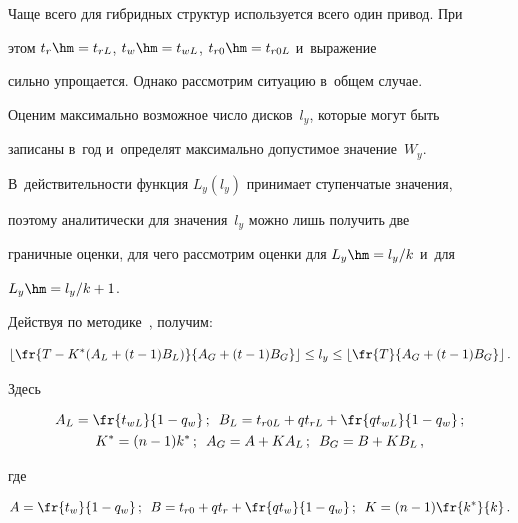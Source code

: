   Чаще всего для гибридных структур используется всего один привод. При 


этом $t_r\hm= t_{rL}$, $t_w\hm= t_{wL}$, $t_{r0}\hm= t_{r0L}$ и~выражение 


сильно упрощается. Однако рассмотрим ситуацию в~общем случае.


  


  Оценим максимально возможное число дисков~$l_y$, которые могут быть 


записаны в~год и~определят максимально допустимое значение~$W_y$. 


В~действительности функция $L_y(l_y)$ принимает ступенчатые значения, 


поэтому аналитически для значения~$l_y$ можно лишь получить две 


граничные оценки, для чего рассмотрим оценки для $L_y\hm= l_y/k$ и~для 


$L_y\hm= l_y/k+1$.


  


  Действуя по методике~\cite{7-che}, получим:


  $$


  \left\lfloor \fr{T-K^*(A_L+(t-1)B_L)}{A_G+(t-1)B_G}\right\rfloor\leq l_y \leq 


\left\lfloor \fr{T}{A_G+(t-1)B_G}\right\rfloor.


  $$


  Здесь


  


  \noindent


  \begin{gather*}


    A_L=\fr{t_{wL}}{1-q_w}\,;\enskip


  B_L=t_{r0L} +qt_{rL}+\fr{qt_{wL}}{1-q_w}\,;\\


   K^*=(n-1)k^*\,;\enskip A_G= A+KA_L\,;\enskip 


B_G=B+KB_L\,,


  \end{gather*}


  где


  \begin{equation*}


  A=\fr{t_w}{1-q_w}\,;\enskip B=t_{r0}+qt_r+\fr{qt_w}{1-q_w}\,;\enskip


  K=(n-1)\fr{k^*}{k}\,.


  \end{equation*}



